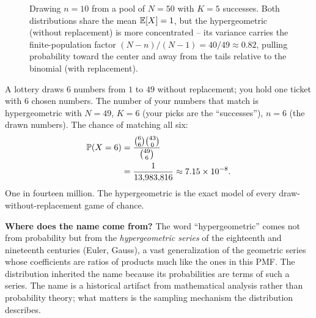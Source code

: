 \begin{figure}[H]
\centering
{}
\caption{Drawing $n=10$ from a pool of $N=50$ with $K=5$ successes. Both
distributions share the mean $\E[X]=1$, but the hypergeometric (without
replacement) is more concentrated -- its variance carries the finite-population
factor $(N-n)/(N-1)=40/49\approx 0.82$, pulling probability toward the center and
away from the tails relative to the binomial (with replacement).}
\label{ch07:fig-hyper-pmf}
\end{figure}

\begin{example}[Lottery]
\label{ch07:ex-lottery}
A lottery draws $6$ numbers from $1$ to $49$ without replacement; you hold one
ticket with $6$ chosen numbers. The number of your numbers that match is
hypergeometric with $N = 49$, $K = 6$ (your picks are the ``successes''), $n = 6$
(the drawn numbers). The chance of matching all six:
\begin{align*}
  \P(X = 6) &= \frac{\binom{6}{6}\binom{43}{0}}{\binom{49}{6}} \\
  &= \frac{1}{13{,}983{,}816} \approx 7.15 \times 10^{-8}.
\end{align*}
One in fourteen million. The hypergeometric is the exact model of every
draw-without-replacement game of chance.
\end{example}

\begin{marginnotebox}
\textbf{Where does the name come from?}
The word ``hypergeometric'' comes not from probability but from the
\emph{hypergeometric series} of the eighteenth and nineteenth centuries (Euler,
Gauss), a vast generalization of the geometric series whose coefficients are
ratios of products much like the ones in this PMF. The distribution inherited the
name because its probabilities are terms of such a series. The name is a
historical artifact from mathematical analysis rather than probability theory;
what matters is the sampling mechanism the distribution describes.
\end{marginnotebox}

